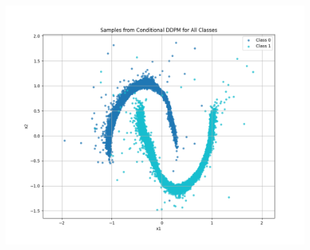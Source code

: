\documentclass[a4paper,12pt]{article}
\begin{document}
\begin{figure}[H]
\begin{minipage}{0.3\textwidth}
      \centering
      \includegraphics[width=\linewidth]{"images/Samples - CFG for cond_ddpm_2_50_0.0001_0.02_moons_1.0_sigmoid.png"}
  \end{minipage}

  \vspace{0.5cm}


\end{figure}
\end{document}
